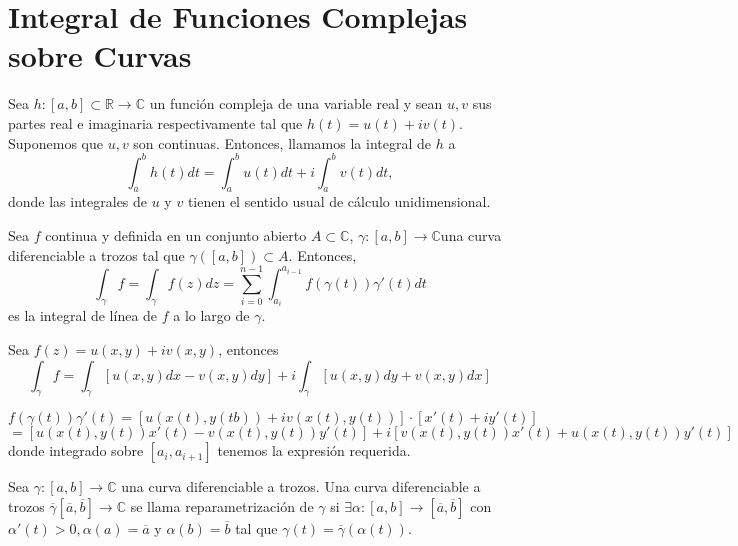 \section{Integral de Funciones Complejas sobre Curvas}

\begin{defn}[Integral]
  Sea $h: [a, b] \subset \mathbb{R} \to \mathbb{C}$ un función compleja de una variable real y sean $u, v$ sus partes real e imaginaria respectivamente tal que $h(t) = u(t) + i v(t)$. Suponemos que $u, v$ son continuas. Entonces, llamamos la integral de $h$ a
  \[ 
    \int_{a}^{b} h(t) dt = \int_{a}^{b} u(t) dt + i \int_{a}^{b} v(t) dt,
  \] 
  donde las integrales de $u$ y $v$ tienen el sentido usual de cálculo unidimensional.
\end{defn}

\begin{defn}
  Sea $f$ continua y definida en un conjunto abierto $A \subset \mathbb{C}$, $\gamma: [a, b] \to \mathbb{C}$una curva diferenciable a trozos tal que $\gamma([a, b]) \subset A$. Entonces,
  \[ 
    \int_{\gamma}^{} f = \int_{\gamma}^{} f(z) dz = \sum_{i = 0}^{n-1} \int_{a_{i}}^{a_{i-1}} f(\gamma(t))\gamma'(t) dt
  \]
  es la integral de línea de $f$ a lo largo de $\gamma$.
\end{defn}

\begin{prop}
  Sea $ f(z) = u(x, y)+ i v(x, y)$, entonces
  \[ 
    \int_{\gamma}^{} f = \int_{\gamma}^{} [u(x, y)dx - v(x, y)dy] + i \int_{\gamma}^{} [u(x,y)dy + v(x, y)dx]
  \] 
\end{prop}

\begin{dem}
  \[ 
    f(\gamma(t))\gamma'(t) = [u(x(t), y(tb)) + i v(x(t), y(t))] \cdot [x'(t) + iy'(t)]
  \] 
  \[ 
    = [u(x(t), y(t))x'(t) - v(x(t), y(t))y'(t)] + i[v(x(t), y(t))x'(t) + u(x(t), y(t))y'(t)]
  \] 
  donde integrado sobre $[a_{i}, a_{i +1}]$ tenemos la expresión requerida.
\end{dem}

\begin{defn}[Reparametrización]
  Sea $\gamma: [a, b] \to \mathbb{C}$ una curva diferenciable a trozos. Una curva diferenciable a trozos $\overline{\gamma} [\overline{a}, \overline{b}] \to \mathbb{C}$ se llama reparametrización de $\gamma$ si $\exists \alpha: [a, b] \to [\overline{a}, \overline{b}]$ con $\alpha'(t) > 0, \alpha(a) = \overline{a}$ y $\alpha(b)= \overline{b}$ tal que $\gamma(t) = \overline{\gamma}(\alpha(t))$.
\end{defn}

